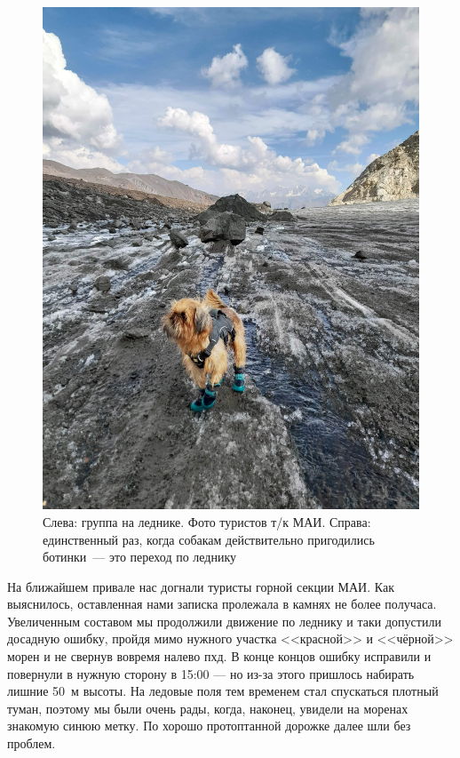 \begin{figure}[h!]
\begin{minipage}[h]{0.4\linewidth}
		\includegraphics[width=0.99\linewidth]{../pics/20240830_155136.jpg}
	\end{minipage}
	\caption{Слева: группа на леднике. Фото туристов т/к МАИ. Справа: единственный раз, когда собакам действительно пригодились ботинки~--- это переход по леднику}
	\label{fig:20240830_141852}
\end{figure}

На ближайшем привале нас догнали туристы горной секции МАИ. Как выяснилось, оставленная нами записка пролежала в камнях не более получаса. Увеличенным составом мы продолжили движение по леднику и таки допустили досадную ошибку, пройдя мимо нужного участка <<красной>> и <<чёрной>> морен и не свернув вовремя налево пхд. В конце концов ошибку исправили и повернули в нужную сторону в 15:00 --- но из-за этого пришлось набирать лишние 50~м высоты. На ледовые поля тем временем стал спускаться плотный туман, поэтому мы были очень рады, когда, наконец, увидели на моренах знакомую синюю метку. По хорошо протоптанной дорожке далее шли без проблем. 


